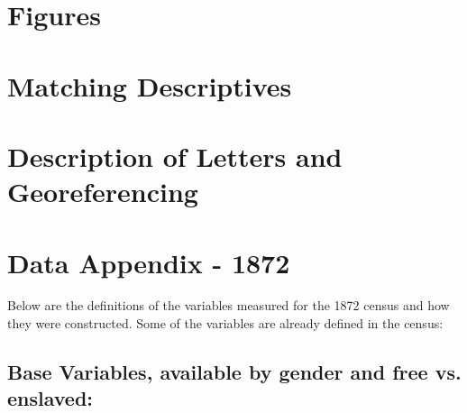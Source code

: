\documentclass{article}
\begin{document}
\section{Figures}

\clearpage

\section{Matching Descriptives}
\label{app:matching_checks}

\clearpage

\section{Description of Letters and Georeferencing}
\label{app:appendix_data}
\clearpage

\section{Data Appendix - 1872}
\label{app:variable_construction_1872}

Below are the definitions of the variables measured for the 1872 census and how they were constructed. Some of the variables are already defined in the census:

\subsection{Base Variables, available by gender and free vs. enslaved:}
\end{document}
